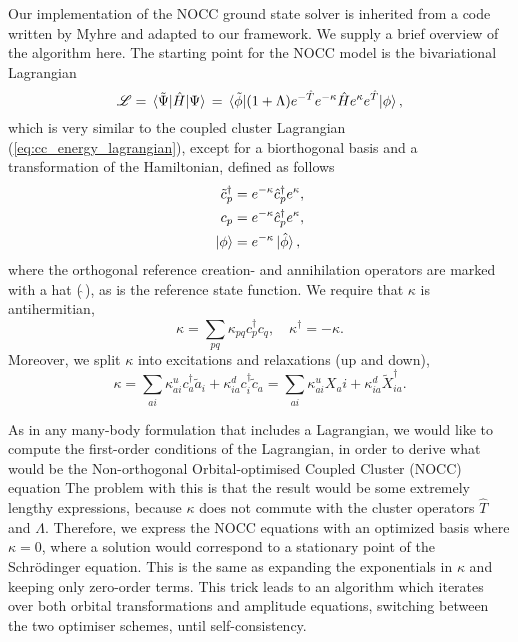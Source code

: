     Our implementation of the NOCC ground state solver is inherited from a code written by
    Myhre \cite{myhre2018demonstrating} and adapted to our 
    framework. We supply a brief overview of the algorithm here. The starting point for the 
    NOCC model is the bivariational Lagrangian
    \begin{equation}
        \label{eq:nocc_lagrangian}
        \mathscr{L} = \mel*{\tilde{\Psi}}{\hat{H}}{\Psi} \\
            = \mel*{\tilde{\phi}}
                {
                (1 + \Lambda) e^{-\hat{T}}e^{-\kappa}\hat{H}e^{\kappa}e^{\hat{T}}
                }{\phi},
    \end{equation}
    which is very similar to the coupled cluster Lagrangian (\autoref{eq:cc_energy_lagrangian}),
    except for a biorthogonal basis and a transformation of the Hamiltonian, defined 
    as follows
    \begin{equation}
        \begin{aligned}
            \tilde{c}_p^\dagger &= e^{-\kappa}\hat{c}_p^\dagger e^\kappa, \\
            c_p &= e^{-\kappa} \hat{c}_p^\dagger e^\kappa, \\
            \ket{\phi} &= e^{-\kappa}\ket*{\hat{\phi}},
        \end{aligned}
    \end{equation}
    where the orthogonal reference creation- and annihilation operators are marked with a hat
    ($\hat{\ }$), as is the reference state function. We require that $\kappa$ is antihermitian,
    \begin{equation}
        \kappa = \sum_{pq} \kappa_{pq}c^\dagger_p c_q, \quad \kappa^\dagger = -\kappa.
    \end{equation}
    Moreover, we split $\kappa$ into excitations and relaxations (up and down),
    \begin{equation}
        \label{eq:agg_kappa}
        \kappa = \sum_{ai} \kappa^u_{ai}c^\dagger_a \tilde{a}_i
            + \kappa^d_{ia} c^\dagger_i \tilde{c}_a
            = \sum_{ai} \kappa^u_{ai} X_ai + \kappa^d_{ia} \tilde{X}^\dagger_{ia}.
    \end{equation} 
    
    As in any many-body formulation that includes a Lagrangian, we would like to compute 
    the first-order conditions of the Lagrangian, in order to derive what would be the 
    Non-orthogonal Orbital-optimised Coupled Cluster (NOCC) equation 
    The problem with this is that the result would be some extremely 
    lengthy expressions, because $\kappa$ does not commute with the cluster 
    operators $\hat{T}$ and $\Lambda$.
    Therefore, we express the NOCC equations with an optimized basis where $\kappa=0$,
    where a solution would correspond to a stationary point of the Schrödinger equation.
    This is the same as expanding the exponentials in $\kappa$ and keeping only zero-order 
    terms. This trick leads to an algorithm which iterates over both orbital transformations 
    and amplitude equations, switching between the two optimiser schemes, until self-consistency.

